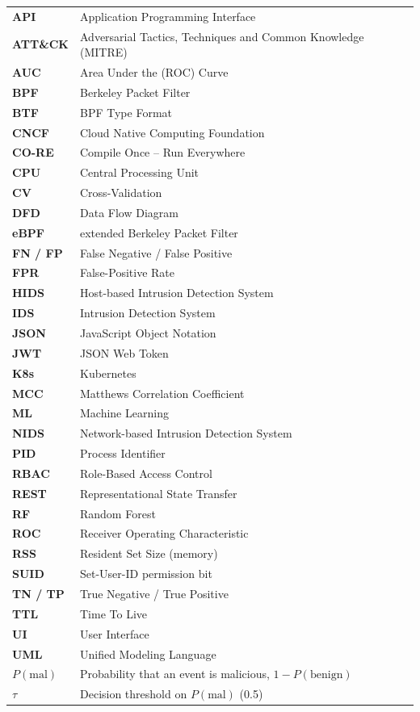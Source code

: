 \begin{longtable}{p{3cm}p{10cm}}
    \textbf{API}     & Application Programming Interface \\
    \textbf{ATT\&CK} & Adversarial Tactics, Techniques and Common Knowledge (MITRE) \\
    \textbf{AUC}     & Area Under the (ROC) Curve \\
    \textbf{BPF}     & Berkeley Packet Filter \\
    \textbf{BTF}     & BPF Type Format \\
    \textbf{CNCF}    & Cloud Native Computing Foundation \\
    \textbf{CO-RE}   & Compile Once -- Run Everywhere \\
    \textbf{CPU}     & Central Processing Unit \\
    \textbf{CV}      & Cross-Validation \\
    \textbf{DFD}     & Data Flow Diagram \\
    \textbf{eBPF}    & extended Berkeley Packet Filter \\
    \textbf{FN / FP} & False Negative / False Positive \\
    \textbf{FPR}     & False-Positive Rate \\
    \textbf{HIDS}    & Host-based Intrusion Detection System \\
    \textbf{IDS}     & Intrusion Detection System \\
    \textbf{JSON}    & JavaScript Object Notation \\
    \textbf{JWT}     & JSON Web Token \\
    \textbf{K8s}     & Kubernetes \\
    \textbf{MCC}     & Matthews Correlation Coefficient \\
    \textbf{ML}      & Machine Learning \\
    \textbf{NIDS}    & Network-based Intrusion Detection System \\
    \textbf{PID}     & Process Identifier \\
    \textbf{RBAC}    & Role-Based Access Control \\
    \textbf{REST}    & Representational State Transfer \\
    \textbf{RF}      & Random Forest \\
    \textbf{ROC}     & Receiver Operating Characteristic \\
    \textbf{RSS}     & Resident Set Size (memory) \\
    \textbf{SUID}    & Set-User-ID permission bit \\
    \textbf{TN / TP} & True Negative / True Positive \\
    \textbf{TTL}     & Time To Live \\
    \textbf{UI}      & User Interface \\
    \textbf{UML}     & Unified Modeling Language \\
    $P(\mathrm{mal})$ & Probability that an event is malicious, $1 - P(\mathrm{benign})$ \\
    $\tau$           & Decision threshold on $P(\mathrm{mal})$ (0.5) \\
\end{longtable}
\clearpage
